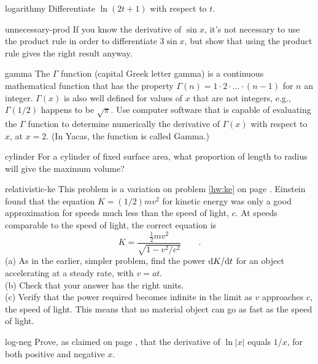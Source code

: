\begin{hwsection}
\begin{hwwithsoln}{logarithmy}
Differentiate $\ln(2t+1)$ with respect to $t$.
\end{hwwithsoln}

\begin{hwwithsoln}{unnecessary-prod}
If you know the derivative of $\sin x$, it's not necessary to use the product rule in order
to differentiate $3\sin x$, but show that using the product rule gives the right result anyway.
\end{hwwithsoln}

\begin{hwwithsoln}{gamma}
The $\Gamma$ function (capital Greek letter gamma) is a continuous mathematical function that
has the property $\Gamma(n)=1\cdot2\cdot\ldots\cdot(n-1)$ for $n$ an integer. $\Gamma(x)$ is also well
defined for values of $x$ that are not integers, e.g., $\Gamma(1/2)$ happens to be $\sqrt{\pi}$.
Use computer software that is capable of evaluating the $\Gamma$ function to determine numerically
the derivative of $\Gamma(x)$ with respect to $x$, at $x=2$. (In Yacas, the function is called Gamma.)
\end{hwwithsoln}

\begin{hwwithsoln}{cylinder}
For a cylinder of fixed surface area, what proportion of length to radius will give the maximum volume?
\end{hwwithsoln}

\begin{hwwithsoln}{relativistic-ke}
This problem is a variation on problem \ref{hw:ke} on page \pageref{hw:ke}. Einstein found that the
equation $K=(1/2)mv^2$ for kinetic energy was only a good approximation for speeds much less than
the speed of light, $c$. At speeds comparable to the speed of light, the correct equation is
\begin{equation*}
  K = \frac{\frac{1}{2}mv^2}{\sqrt{1-v^2/c^2}} \qquad .
\end{equation*}
(a) As in the earlier, simpler problem, find the power $\textup{d} K/\textup{d} t$ for an object accelerating
at a steady rate, with $v=at$. \\
(b) Check that your answer has the right units.\\
(c) Verify that the power required becomes infinite in the limit as $v$ approaches $c$, the speed of
light. This means that no material object can go as fast as the speed of light.
\end{hwwithsoln}

\begin{hwwithsoln}{log-neg}
Prove, as claimed on page \pageref{log-neg},
that the derivative of $\ln |x|$ equals $1/x$, for both positive and negative $x$.
\end{hwwithsoln}


\end{hwsection}
